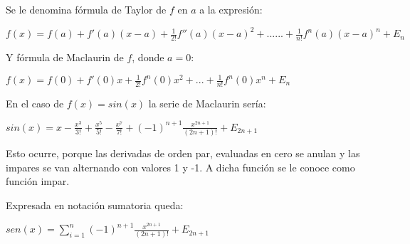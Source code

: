  Se le denomina f\'ormula de Taylor de $f$ en $a$ a la expresi\'on:
 
\begin{center}
$f(x) = f(a) + f '(a) (x-a) + \frac{1}{2!} f '' (a) (x-a) ^ 2 + ...... + \frac{1}{n!} f ^ n(a) (x-a) ^ n + E_{n}$

\end{center}

Y f\'ormula de Maclaurin de $f$, donde $a = 0$:

\begin{center}
$f(x) = f(0) + f'(0)x + \frac{1}{2!} f^n(0) x^2 + ... + \frac{1}{n!}f^n(0)x^n + E_{n}$

\end{center}

En el caso de $f(x) = sin(x)$ la serie de Maclaurin ser\'ia:

\begin{center}
$sin(x) = x - \frac{x^3}{3!} + \frac{x^5}{5!} - \frac{x^7}{7!} +(-1)^{n+1} \frac {x^{2n+1}}{(2n+1)!} + E_{2n+1}$

\end{center}

Esto ocurre, porque las derivadas de orden par, evaluadas en cero se anulan y las impares se van alternando con valores 1 y -1. A dicha funci\'on se le conoce
como funci\'on impar.

Expresada en notaci\'on sumatoria queda:

\begin{center}

$sen(x)= \sum\limits_{i=1}^{n}(-1)^{n+1} \frac{x^{2n+1}}{(2n+1)!} + E_{2n+1}$

\end{center}








